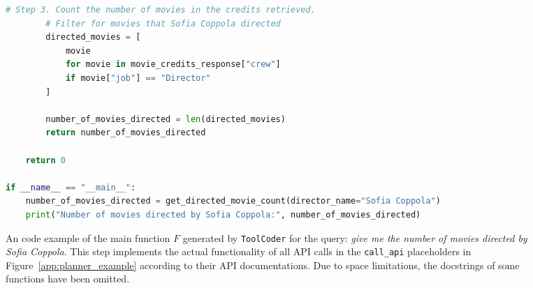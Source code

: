 \begin{figure*}[ht]
\begin{lstlisting}[language=python, basicstyle=\ttfamily\tiny]
        # Step 3. Count the number of movies in the credits retrieved.
        # Filter for movies that Sofia Coppola directed
        directed_movies = [
            movie
            for movie in movie_credits_response["crew"]
            if movie["job"] == "Director"
        ]

        number_of_movies_directed = len(directed_movies)
        return number_of_movies_directed

    return 0

if __name__ == "__main__":
    number_of_movies_directed = get_directed_movie_count(director_name="Sofia Coppola")
    print("Number of movies directed by Sofia Coppola:", number_of_movies_directed)
\end{lstlisting}
\caption{An code example of the main function $F$ generated by \texttt{ToolCoder} for the query: \textit{give me the number of movies directed by Sofia Coppola}. This step implements the actual functionality of all API calls in the \texttt{call\_api} placeholders in Figure~\ref{app:planner_example} according to their API documentations. Due to space limitations, the docstrings of some functions have been omitted.}
\label{app:main_function_example}
\end{figure*}